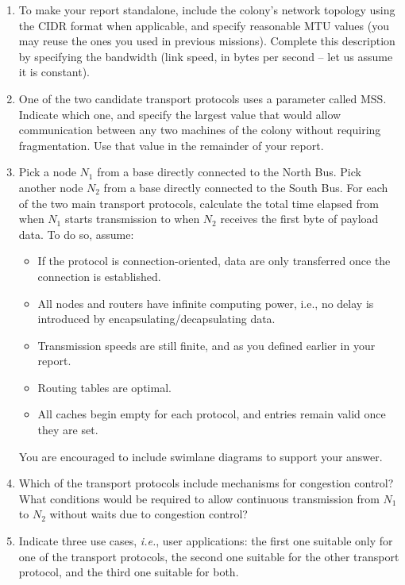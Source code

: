 \begin{enumerate}[itemsep=0.1cm]
\item To make your report standalone, include the colony's network topology using the CIDR format when applicable,
and specify reasonable MTU values (you may reuse the ones you used in previous missions). Complete this description by
specifying the bandwidth (link speed, in bytes per second -- let us assume it is constant).

\item One of the two candidate transport protocols uses a parameter called MSS. Indicate which one, and specify the largest
value that would allow communication between any two machines of the colony without requiring fragmentation. Use that value in the remainder of your report.

\item Pick a node $N_1$ from a base directly connected to the North Bus. Pick another node $N_2$ from a base directly connected to the South Bus. For each of the two main transport protocols, calculate the total time elapsed from when $N_1$ starts transmission to when $N_2$ receives the first byte of payload data. To do so, assume:
  \begin{itemize}
  \item If the protocol is connection-oriented, data are only transferred once the connection is established.
  \item All nodes and routers have infinite computing power, i.e., no delay is introduced by encapsulating/decapsulating data.
  \item Transmission speeds are still finite, and as you defined earlier in your report.
  \item Routing tables are optimal.
  \item All caches begin empty for each protocol, and entries remain valid once they are set.
  \end{itemize}
You are encouraged to include swimlane diagrams to support your answer.

\item Which of the transport protocols include mechanisms for congestion control? What conditions would be required to allow continuous transmission from $N_1$ to $N_2$ without waits due to congestion control?

\item Indicate three use cases, \textit{i.e.}, user applications: the first one suitable only for one of the transport protocols, the second one suitable for the other transport protocol, and the third one suitable for both.
\end{enumerate}

